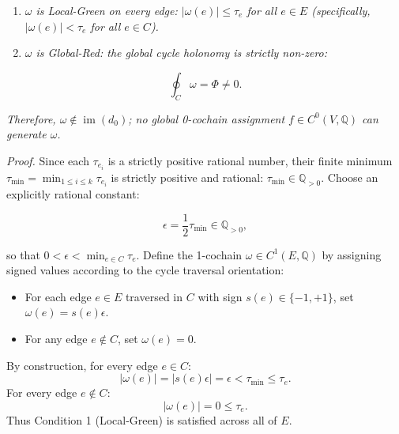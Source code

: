 \documentclass[
  10pt,
]{article}
\begin{document}
\begin{enumerate}
\def\labelenumi{\arabic{enumi}.}
\item
  \emph{\hypertarget{math-E0099-0118}{}{\(\omega\)} is Local-Green on every edge: \hypertarget{math-E0100-0119}{}{\(|\omega(e)| \le \tau_e\)} for all \hypertarget{math-E0076-0120}{}{\(e \in E\)} (specifically, \hypertarget{math-E0101-0121}{}{\(|\omega(e)| < \tau_e\)} for all \hypertarget{math-E0102-0122}{}{\(e \in C\)}).}
\item
  \emph{\hypertarget{math-E0099-0123}{}{\(\omega\)} is Global-Red: the global cycle holonomy is strictly non-zero:}
\end{enumerate}

\hypertarget{math-E0103-0124}{}{\[\oint_C \omega = \Phi \ne 0.\]}

\emph{Therefore, \hypertarget{math-E0104-0125}{}{\(\omega \notin \operatorname{im}(d_0)\)}; no global 0-cochain assignment \hypertarget{math-E0085-0126}{}{\(f \in C^0(V, \mathbb{Q})\)} can generate \hypertarget{math-E0099-0127}{}{\(\omega\)}.}

\emph{Proof.} Since each \hypertarget{math-E0105-0128}{}{\(\tau_{e_i}\)} is a strictly positive rational number, their finite minimum \hypertarget{math-E0106-0129}{}{\(\tau_{\min} = \min_{1 \le i \le k} \tau_{e_i}\)} is strictly positive and rational: \hypertarget{math-E0107-0130}{}{\(\tau_{\min} \in \mathbb{Q}_{> 0}\)}. Choose an explicitly rational constant:

\hypertarget{math-E0108-0131}{}{\[\epsilon = \frac{1}{2} \tau_{\min} \in \mathbb{Q}_{> 0},\]}

so that \hypertarget{math-E0109-0132}{}{\(0 < \epsilon < \min_{e \in C} \tau_e\)}. Define the 1-cochain \hypertarget{math-E0081-0133}{}{\(\omega \in C^1(E, \mathbb{Q})\)} by assigning signed values according to the cycle traversal orientation:

\begin{itemize}
\item
  For each edge \hypertarget{math-E0076-0134}{}{\(e \in E\)} traversed in \hypertarget{math-E0097-0135}{}{\(C\)} with sign \hypertarget{math-E0110-0136}{}{\(s(e) \in \{-1, +1\}\)}, set \hypertarget{math-E0111-0137}{}{\(\omega(e) = s(e) \epsilon\)}.
\item
  For any edge \hypertarget{math-E0112-0138}{}{\(e \notin C\)}, set \hypertarget{math-E0113-0139}{}{\(\omega(e) = 0\)}.
\end{itemize}

By construction, for every edge \hypertarget{math-E0102-0140}{}{\(e \in C\)}: \hypertarget{math-E0114-0141}{}{\[|\omega(e)| = |s(e) \epsilon| = \epsilon < \tau_{\min} \le \tau_e.\]} For every edge \hypertarget{math-E0112-0142}{}{\(e \notin C\)}: \hypertarget{math-E0115-0143}{}{\[|\omega(e)| = 0 \le \tau_e.\]} Thus Condition 1 (Local-Green) is satisfied across all of \hypertarget{math-E0116-0144}{}{\(E\)}.
\end{document}
